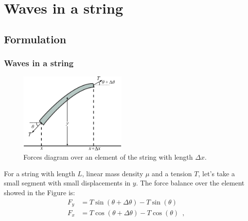 \documentclass{beamer}
\begin{document}
\section{Waves in a string}
\subsection{Formulation}
\begin{frame}\frametitle{Waves in a string}
	
\transwipe
	
\begin{figure}[h]
	\centering
	\includegraphics[height=4cm]{img/string.pdf}
	\caption{Forces diagram over an element of the string with length $\Delta x$. }
\end{figure}

 {For a string with length $L$, linear mass density $\mu$ and a tension $T$, let's take a small segment with small displacements in $y$. The force balance over the element showed in the Figure is:
\begin{align*}
F_y &= T \sin(\theta + \Delta \theta) - T \sin(\theta)\\
F_x &= T \cos(\theta + \Delta \theta) - T \cos(\theta) \enspace ,
\end{align*}}

\end{frame}
\end{document}
